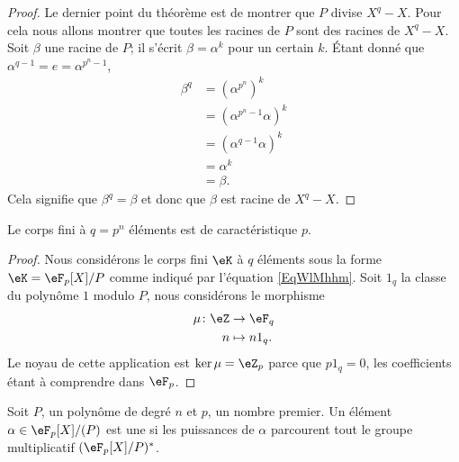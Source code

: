 \begin{proof}
    Le dernier point du théorème est de montrer que \( P\) divise \( X^q-X\). Pour cela nous allons montrer que toutes les racines de \( P\) sont des racines de \( X^q-X\). Soit \( \beta\) une racine de \( P\); il s'écrit \( \beta=\alpha^k\) pour un certain \( k\). Étant donné que \( \alpha^{q-1}=e=\alpha^{p^n-1}\),
    \begin{subequations}
        \begin{align}
            \beta^q&=(\alpha^{p^n})^k\\
            &=\left( \alpha^{p^n-1}\alpha \right)^k\\
            &=\left( \alpha^{q-1}\alpha \right)^k\\
            &=\alpha^k\\
            &=\beta.
        \end{align}
    \end{subequations}
    Cela signifie que \( \beta^q=\beta\) et donc que \( \beta\) est racine de \( X^q-X\).
\end{proof}

\begin{corollary}
    Le corps fini à \( q=p^n\) éléments est de caractéristique \( p\).
\end{corollary}

\begin{proof}
    Nous considérons le corps fini \( \eK\) à \( q\) éléments sous la forme \( \eK=\eF_p[X]/P\) comme indiqué par l'équation \eqref{EqWlMhhm}. Soit \( 1_q\) la classe du polynôme \( 1\) modulo \( P\), nous considérons le morphisme
    \begin{equation}
        \begin{aligned}
            \mu\colon \eZ&\to \eF_q \\
            n&\mapsto n1_q.
        \end{aligned}
    \end{equation}
    Le noyau de cette application est \( \ker\mu=\eZ_p\) parce que \( p1_q=0\), les coefficients étant à comprendre dans \( \eF_p\).
\end{proof}

\begin{definition}  \label{DefnPNCFO}
    Soit \( P\), un polynôme de degré \( n\) et \( p\), un nombre premier. Un élément \( \alpha\in \eF_p[X]/(P)\) est une  si les puissances de \( \alpha\) parcourent tout le groupe multiplicatif \( (\eF_p[X]/P)^*\).
\end{definition}


